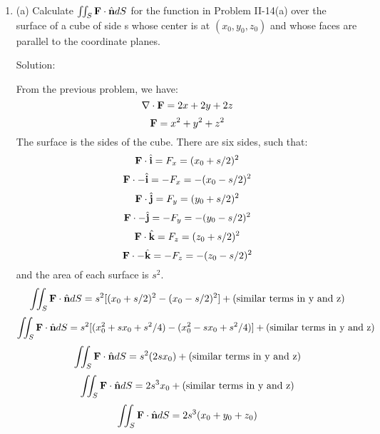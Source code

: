 \documentclass{article}
\begin{document}
\begin{enumerate}
    (e) $(\vvec{(-xy)}{x^2}{0}) / (x^2 + y^2)$

    Solution:

    \centerline{TODO - show these derivatives}
    \[ \nabla \cdot \bb{F} = \frac{y(x^2-y^2)}{(x^2 + y^2)^2} - \frac{2x^2y}{(x^2 + y^2)^2} \]
    \[ \nabla \cdot \bb{F} = \frac{yx^2 - y^3 - 2x^2y}{(x^2 + y^2)^2} \]
    \[ \nabla \cdot \bb{F} = \frac{y(-x^2 - y^2)}{(x^2 + y^2)^2} \]
    \[ \nabla \cdot \bb{F} = \frac{-y}{(x^2 + y^2)} \]

    (f) $\bb{k}\sqrt{x^2 + y^2}$

    Solution:

    \[ \nabla \cdot \bb{F} = 0 + 0 + \pd[]{z}{\sqrt{x^2 + y^2}} = 0 \]

    (g) $\vvec{x}{y}{z}$

    Solution:

    \[ \nabla \cdot \bb{F} = \pd[]{x}{x} + \pd[]{y}{y} + \pd[]{z}{z} \]
    \[ \nabla \cdot \bb{F} = 1 + 1 + 1 = 3\]

    (h) $\vvec{(-y)}{x}{0}/\sqrt{x^2 + y^2}$

    Solution:
    \[ \nabla \cdot \bb{F} = -y(-1/2)(x^2 + y^2)^{-3/2}(2x) + x(-1/2)(x^2 + y^2)^{-3/2}(2y) \]
    \[ \nabla \cdot \bb{F} = \frac{xy}{(x^2 + y^2)^{-3/2}} + \frac{-xy}{(x^2 + y^2)^{-3/2}} \]
    \[ \nabla \cdot \bb{F} = 0 \]

    \item (a) Calculate $\iint_S \textbf{F} \cdot \hat{\textbf{n}} dS$ for the function in Problem II-14(a)
    over the surface of a cube of side s whose center is at $(x_0, y_0, z_0)$ and whose faces
    are parallel to the coordinate planes.

    Solution:

    From the previous problem, we have:
    \[ \nabla \cdot \textbf{F} = 2x + 2y + 2z \]
    \[ \textbf{F} = x^2 + y^2 + z^2 \]
    The surface is the sides of the cube. There are six sides, such that:
    \[ \textbf{F} \cdot \hat{\textbf{i}} = F_x = (x_0 + s/2)^2 \]
    \[ \textbf{F} \cdot -\hat{\textbf{i}} = -F_x = -(x_0 - s/2)^2 \]
    \[ \textbf{F} \cdot \hat{\textbf{j}} = F_y = (y_0 + s/2)^2 \]
    \[ \textbf{F} \cdot -\hat{\textbf{j}} = -F_y = -(y_0 - s/2)^2 \]
    \[ \textbf{F} \cdot \hat{\textbf{k}} = F_z = (z_0 + s/2)^2 \]
    \[ \textbf{F} \cdot -\hat{\textbf{k}} = -F_z = -(z_0 - s/2)^2 \]
    and the area of each surface is $s^2$.
    \[ \iint_S \textbf{F} \cdot \hat{\textbf{n}} dS = s^2[(x_0 + s/2)^2 -(x_0 - s/2)^2] + (\textnormal{similar terms in y and z}) \]
    \[ \iint_S \textbf{F} \cdot \hat{\textbf{n}} dS = s^2[(x_0^2 + sx_0 + s^2/4) -(x_0^2 - sx_0 + s^2/4)] + (\textnormal{similar terms in y and z}) \]
    \[ \iint_S \textbf{F} \cdot \hat{\textbf{n}} dS = s^2(2sx_0) + (\textnormal{similar terms in y and z}) \]
    \[ \iint_S \textbf{F} \cdot \hat{\textbf{n}} dS = 2s^3x_0 + (\textnormal{similar terms in y and z}) \]
    \[ \iint_S \textbf{F} \cdot \hat{\textbf{n}} dS = 2s^3(x_0 + y_0 + z_0) \]


\end{enumerate}
\end{document}
